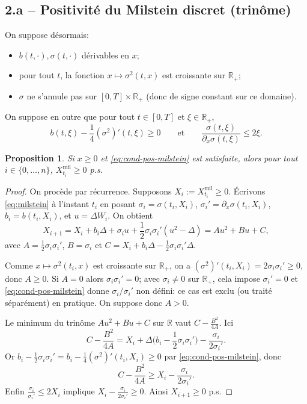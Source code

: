 \documentclass[11pt,a4paper]{article}
\newcommand{\R}{\mathbb{R}}
\newcommand{\1}{\mathbbm{1}}
\theoremstyle{plain}
\newtheorem{proposition}{Proposition}
\theoremstyle{definition}
\begin{document}
\subsection{2.a -- Positivité du Milstein discret (trinôme)}
On suppose désormais:
\begin{itemize}[leftmargin=*]
  \item $b(t,\cdot),\sigma(t,\cdot)$ dérivables en $x$;
  \item pour tout $t$, la fonction $x\mapsto \sigma^2(t,x)$ est croissante sur $\R_+$;
  \item $\sigma$ ne s'annule pas sur $[0,T]\times\R_+$ (donc de signe constant sur ce domaine).
\end{itemize}
On suppose en outre que pour tout $t\in[0,T]$ et $\xi\in\R_+$,
\begin{equation}\label{eq:cond-pos-milstein}
b(t,\xi)-\frac14(\sigma^2)'(t,\xi)\ge 0
\qquad\text{et}\qquad
\frac{\sigma(t,\xi)}{\partial_x\sigma(t,\xi)}\le 2\xi.
\end{equation}
\begin{proposition}
Si $x\ge 0$ et \eqref{eq:cond-pos-milstein} est satisfaite, alors pour tout $i\in\{0,\dots,n\}$,
$X^{\mathrm{mil}}_{t_i}\ge 0$ p.s.
\end{proposition}
\begin{proof}
On procède par récurrence. Supposons $X_i:=X^{\mathrm{mil}}_{t_i}\ge 0$. Écrivons \eqref{eq:milstein} à l'instant $t_i$ en posant
$\sigma_i=\sigma(t_i,X_i)$, $\sigma_i'=\partial_x\sigma(t_i,X_i)$, $b_i=b(t_i,X_i)$, et $u=\Delta W_i$.
On obtient
\[
X_{i+1}=X_i+b_i\Delta+\sigma_i u+\frac12\sigma_i\sigma_i'(u^2-\Delta)
=Au^2+Bu+C,
\]
avec $A=\frac12\sigma_i\sigma_i'$, $B=\sigma_i$ et $C=X_i+b_i\Delta-\frac12\sigma_i\sigma_i'\Delta$.

Comme $x\mapsto \sigma^2(t_i,x)$ est croissante sur $\R_+$, on a $(\sigma^2)'(t_i,X_i)=2\sigma_i\sigma_i'\ge 0$, donc $A\ge 0$.
Si $A=0$ alors $\sigma_i\sigma_i'=0$; avec $\sigma_i\neq 0$ sur $\R_+$, cela impose $\sigma_i'=0$ et \eqref{eq:cond-pos-milstein} donne $\sigma_i/\sigma_i'$ non défini: ce cas est exclu (ou traité séparément) en pratique. On suppose donc $A>0$.

Le minimum du trinôme $Au^2+Bu+C$ sur $\R$ vaut $C-\frac{B^2}{4A}$. Ici
\[
C-\frac{B^2}{4A}=X_i+\Delta\Big(b_i-\frac12\sigma_i\sigma_i'\Big)-\frac{\sigma_i}{2\sigma_i'}.
\]
Or $b_i-\frac12\sigma_i\sigma_i'=b_i-\frac14(\sigma^2)'(t_i,X_i)\ge 0$ par \eqref{eq:cond-pos-milstein}, donc
\[
C-\frac{B^2}{4A}\ge X_i-\frac{\sigma_i}{2\sigma_i'}.
\]
Enfin $\frac{\sigma_i}{\sigma_i'}\le 2X_i$ implique $X_i-\frac{\sigma_i}{2\sigma_i'}\ge 0$. Ainsi $X_{i+1}\ge 0$ p.s.
\end{proof}
\end{document}
